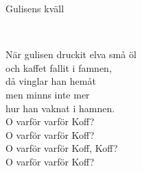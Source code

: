 \begin{song}{Gulisens kväll}
	
		
	\\
	
	När gulisen druckit elva små öl\\
	och kaffet fallit i famnen,\\
	då vinglar han hemåt\\
	men minns inte mer\\
	hur han vaknat i hamnen.\\
	O varför varför Koff?\\
	O varför varför Koff?\\
	O varför varför Koff, Koff?\\
	O varför varför Koff?
	
\end{song}
